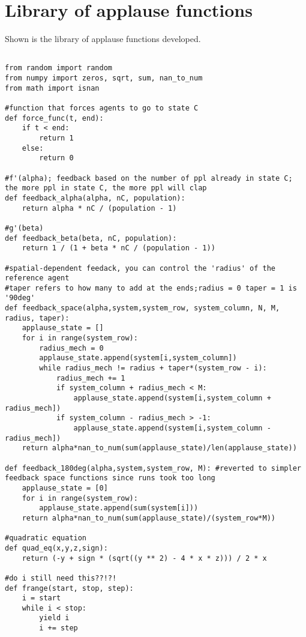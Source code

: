 \chapter{Library of applause functions}
\label{apndx:codelib}

Shown is the library of applause functions developed.

\begin{lstlisting}

from random import random
from numpy import zeros, sqrt, sum, nan_to_num
from math import isnan

#function that forces agents to go to state C
def force_func(t, end):
    if t < end:
        return 1
    else:
        return 0

#f'(alpha); feedback based on the number of ppl already in state C; the more ppl in state C, the more ppl will clap
def feedback_alpha(alpha, nC, population):
    return alpha * nC / (population - 1)
    
#g'(beta)
def feedback_beta(beta, nC, population):
    return 1 / (1 + beta * nC / (population - 1))
       
#spatial-dependent feedack, you can control the 'radius' of the reference agent
#taper refers to how many to add at the ends;radius = 0 taper = 1 is '90deg'    
def feedback_space(alpha,system,system_row, system_column, N, M, radius, taper):
    applause_state = []
    for i in range(system_row):
        radius_mech = 0
        applause_state.append(system[i,system_column])
        while radius_mech != radius + taper*(system_row - i):
            radius_mech += 1
            if system_column + radius_mech < M:
                applause_state.append(system[i,system_column + radius_mech])
            if system_column - radius_mech > -1:
                applause_state.append(system[i,system_column - radius_mech])
    return alpha*nan_to_num(sum(applause_state)/len(applause_state))
    
def feedback_180deg(alpha,system,system_row, M): #reverted to simpler feedback space functions since runs took too long
    applause_state = [0]
    for i in range(system_row):
        applause_state.append(sum(system[i]))
    return alpha*nan_to_num(sum(applause_state)/(system_row*M))    

#quadratic equation    
def quad_eq(x,y,z,sign):
    return (-y + sign * (sqrt((y ** 2) - 4 * x * z))) / 2 * x

#do i still need this??!?!
def frange(start, stop, step):
    i = start
    while i < stop:
        yield i
        i += step
   

\end{lstlisting}

